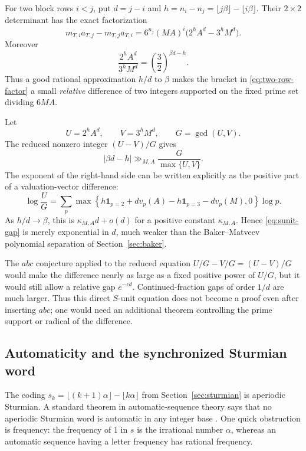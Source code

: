 \documentclass[11pt,oneside]{article}
\theoremstyle{definition}
\theoremstyle{remark}
\begin{document}
For two block rows $i<j$, put $d=j-i$ and
$h=n_i-n_j=\lfloor j\beta\rfloor-\lfloor i\beta\rfloor$.  Their $2\times2$ determinant has
the exact factorization
\begin{equation}\label{eq:two-row-factor}
 m_{T,i}a_{T,j}-m_{T,j}a_{T,i}
 =6^{n_j}(MA)^i\bigl(2^hA^d-3^hM^d\bigr).
\end{equation}
Moreover
\begin{equation}\label{eq:two-row-ratio}
 \frac{2^hA^d}{3^hM^d}
 =\left(\frac32\right)^{\beta d-h}.
\end{equation}
Thus a good rational approximation $h/d$ to $\beta$ makes the bracket in
\eqref{eq:two-row-factor} a small \emph{relative} difference of two integers supported on the
fixed prime set dividing $6MA$.

Let
\[
 U=2^hA^d,
 \qquad V=3^hM^d,
 \qquad G=\gcd(U,V).
\]
The reduced nonzero integer $(U-V)/G$ gives
\begin{equation}\label{eq:sunit-gap}
 |\beta d-h|
 \gg_{M,A}\frac{G}{\max\{U,V\}}.
\end{equation}
The exponent of the right-hand side can be written explicitly as the positive part of a
valuation-vector difference:
\begin{equation}\label{eq:sunit-rate}
 \log\frac{U}{G}
 =\sum_p
 \max\!\left
 \{h\mathbf1_{p=2}+d v_p(A)
   -h\mathbf1_{p=3}-d v_p(M),0\right\}\log p.
\end{equation}
As $h/d\to\beta$, this is $\kappa_{M,A}d+o(d)$ for a positive constant
$\kappa_{M,A}$.  Hence \eqref{eq:sunit-gap} is merely exponential in $d$, much weaker than the
Baker--Matveev polynomial separation of Section~\ref{sec:baker}.

The $abc$ conjecture applied to the reduced equation $U/G-V/G=(U-V)/G$ would make the
difference nearly as large as a fixed positive power of $U/G$, but it would still allow a
relative gap $e^{-\epsilon d}$.  Continued-fraction gaps of order $1/d$ are much larger.
Thus this direct $S$-unit equation does not become a proof even after inserting $abc$; one
would need an additional theorem controlling the prime support or radical of the difference.

\subsection{Automaticity and the synchronized Sturmian word}

The coding $s_k=\lfloor(k+1)\alpha\rfloor-\lfloor k\alpha\rfloor$ from
Section~\ref{sec:sturmian} is aperiodic Sturmian.  A standard theorem in automatic-sequence
theory says that no aperiodic Sturmian word is automatic in any integer base
\cite{Cobham1972,AlloucheShallit2003}.  One quick obstruction is frequency: the frequency of
$1$ in $s$ is the irrational number $\alpha$, whereas an automatic sequence having a letter
frequency has rational frequency.
\end{document}
